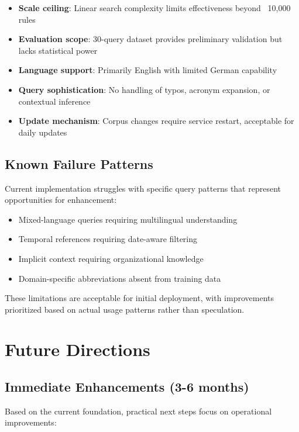 \begin{itemize}[leftmargin=*,itemsep=2pt,topsep=2pt]
  \item \textbf{Scale ceiling}: Linear search complexity limits effectiveness beyond ~10,000 rules
  \item \textbf{Evaluation scope}: 30-query dataset provides preliminary validation but lacks statistical power
  \item \textbf{Language support}: Primarily English with limited German capability
  \item \textbf{Query sophistication}: No handling of typos, acronym expansion, or contextual inference
  \item \textbf{Update mechanism}: Corpus changes require service restart, acceptable for daily updates
\end{itemize}

\subsection{Known Failure Patterns}

Current implementation struggles with specific query patterns that represent opportunities for enhancement:

\begin{itemize}[leftmargin=*,itemsep=2pt,topsep=2pt]
  \item Mixed-language queries requiring multilingual understanding
  \item Temporal references requiring date-aware filtering
  \item Implicit context requiring organizational knowledge
  \item Domain-specific abbreviations absent from training data
\end{itemize}

These limitations are acceptable for initial deployment, with improvements prioritized based on actual usage patterns rather than speculation.

\section{Future Directions}

\subsection{Immediate Enhancements (3-6 months)}

Based on the current foundation, practical next steps focus on operational improvements:

